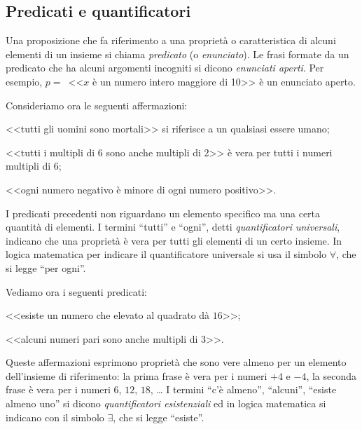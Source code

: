 \subsection{Predicati e quantificatori}

Una proposizione che fa riferimento a una proprietà o caratteristica 
di alcuni elementi di un insieme si chiama \emph{predicato} (o 
\emph{enunciato}). Le frasi formate da un predicato che ha alcuni 
argomenti incogniti si dicono \emph{enunciati aperti}.
Per esempio, $p=$~<<$x$ è un numero intero maggiore di 10>> è un 
enunciato aperto.

Consideriamo ora le seguenti affermazioni:
\begin{itemize*}
\item <<tutti gli uomini sono mortali>> si riferisce a un qualsiasi 
essere umano;
\item <<tutti i multipli di 6 sono anche multipli di 2>> è vera per 
tutti i numeri multipli di 6;
\item <<ogni numero negativo è minore di ogni numero positivo>>.
\end{itemize*}
I predicati precedenti non riguardano un elemento specifico ma una 
certa quantità di elementi. I termini ``tutti'' e ``ogni'', detti 
\emph{quantificatori universali}, indicano che una proprietà è vera 
per tutti gli elementi di un certo insieme. In logica matematica per 
indicare il quantificatore universale si usa il simbolo $\forall$, 
che si legge ``per ogni''.

Vediamo ora i seguenti predicati:
\begin{itemize*}
\item <<esiste un numero che elevato al quadrato dà $16$>>;
\item <<alcuni numeri pari sono anche multipli di $3$>>.
\end{itemize*}
Queste affermazioni esprimono proprietà che sono vere almeno per un 
elemento dell'insieme di riferimento: la prima frase è vera per i 
numeri $+4$ e $-4$, la seconda frase è vera per i numeri $6$, $12$, 
$18$, \ldots{}
I termini ``c'è almeno'', ``alcuni'', ``esiste almeno uno'' si dicono 
\emph{quantificatori esistenziali} ed in logica matematica si 
indicano con il simbolo $\exists$, che si legge ``esiste''.

